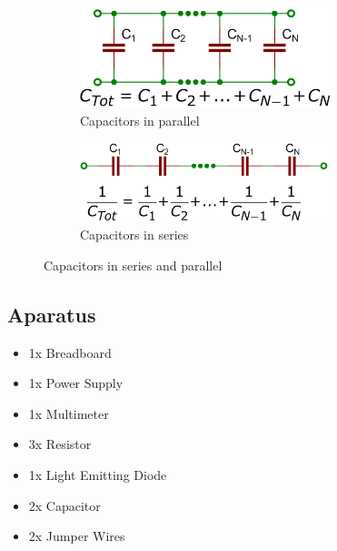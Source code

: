 \documentclass[a4paper, 10pt]{article}
\begin{document}
				\begin{figure}[h!]
					\centering
					\begin{subfigure}[h]{0.4\textwidth}
						\centering
						\includegraphics[width=0.8\textwidth]{./images/CapacitorsParallelConnection.png}
						\caption{Capacitors in parallel}
						\label{fig:capacitors_in_parallel}
					\end{subfigure}
					\hspace*{0.1\textwidth}
					\begin{subfigure}[h]{0.4\textwidth}
						\centering
						\includegraphics[width=0.8\textwidth]{./images/CapacitorsSeriesConnection.png}
						\caption{Capacitors in series}
						\label{fig:capacitors_in_series}
					\end{subfigure}

					\caption{Capacitors in series and parallel}
					\label{fig:capacitors_in_series_and_parallel}
				\end{figure}

		\subsection{Aparatus}
			\begin{itemize}
				\item 1x Breadboard
				\item 1x Power Supply
				\item 1x Multimeter
				\item 3x Resistor
				\item 1x Light Emitting Diode
				\item 2x Capacitor
				\item 2x Jumper Wires
			\end{itemize}
\end{document}
